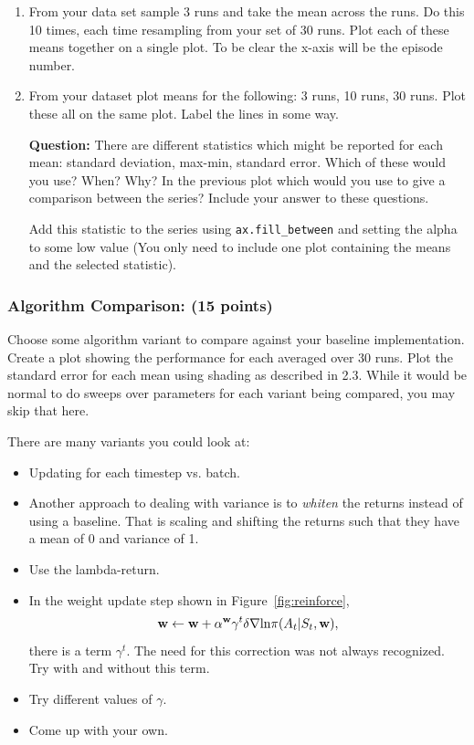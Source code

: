\documentclass{article}
\newcommand{\w}{{\bf w}}
\begin{document}
\begin{enumerate}
    \item From your data set sample 3 runs and take the mean across the runs. Do this 10 times, each time resampling from your set of 30 runs. Plot each of these means together on a single plot. To be clear the x-axis will be the episode number.
    \item From your dataset plot means for the following: 3 runs, 10 runs, 30 runs. Plot these all on the same plot. Label the lines in some way.
    
    \noindent\textbf{Question:} There are different statistics which might be reported for each mean: standard deviation, max-min, standard error. Which of these would you use? When? Why? In the previous plot which would you use to give a comparison between the series? Include your answer to these questions. 
    
    Add this statistic to the series using \verb|ax.fill_between| and setting the alpha to some low value (You only need to include one plot containing the means and the selected statistic).
    
\end{enumerate}



\subsubsection{Algorithm Comparison: (15 points)}

Choose some algorithm variant to compare against your baseline implementation. Create a plot showing the performance for each averaged over 30 runs. Plot the standard error for each mean using shading as described in 2.3. While it would be normal to do sweeps over parameters for each variant being compared, you may skip that here.

There are many variants you could look at:

\begin{itemize}
    \item Updating for each timestep vs. batch.
    \item Another approach to dealing with variance is to \textit{whiten} the returns instead of using a baseline. That is scaling and shifting the returns such that they have a mean of 0 and variance of 1.
    \item Use the lambda-return.
    \item In the weight update step shown in Figure~\ref{fig:reinforce},
    \begin{align*}
        \w \leftarrow{} \w + \alpha^{\w}\gamma^t \delta \nabla \text{ln} \pi(A_t|S_t,\w),
    \end{align*}
    there is a term $\gamma^t$. The need for this correction was not always recognized. Try with and without this term.
    \item Try different values of $\gamma$.
    \item Come up with your own.
\end{itemize}
\end{document}
